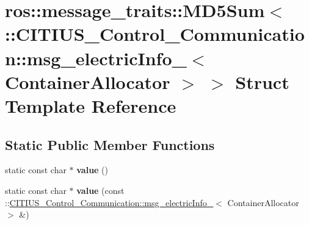 \hypertarget{structros_1_1message__traits_1_1_m_d5_sum_3_01_1_1_c_i_t_i_u_s___control___communication_1_1msg_20a1605dbd67ae3e89dfe57fef2b5cf4}{\section{ros\-:\-:message\-\_\-traits\-:\-:\-M\-D5\-Sum$<$ \-:\-:\-C\-I\-T\-I\-U\-S\-\_\-\-Control\-\_\-\-Communication\-:\-:msg\-\_\-electric\-Info\-\_\-$<$ \-Container\-Allocator $>$ $>$ \-Struct \-Template \-Reference}
\label{structros_1_1message__traits_1_1_m_d5_sum_3_01_1_1_c_i_t_i_u_s___control___communication_1_1msg_20a1605dbd67ae3e89dfe57fef2b5cf4}
}
\subsection*{\-Static \-Public \-Member \-Functions}
\begin{DoxyCompactItemize}
\item 
\hypertarget{structros_1_1message__traits_1_1_m_d5_sum_3_01_1_1_c_i_t_i_u_s___control___communication_1_1msg_20a1605dbd67ae3e89dfe57fef2b5cf4_a5d8e5cf35ef9bb1a78cfb9b1c0127ff1}{static const char $\ast$ {\bfseries value} ()}\label{structros_1_1message__traits_1_1_m_d5_sum_3_01_1_1_c_i_t_i_u_s___control___communication_1_1msg_20a1605dbd67ae3e89dfe57fef2b5cf4_a5d8e5cf35ef9bb1a78cfb9b1c0127ff1}

\item 
\hypertarget{structros_1_1message__traits_1_1_m_d5_sum_3_01_1_1_c_i_t_i_u_s___control___communication_1_1msg_20a1605dbd67ae3e89dfe57fef2b5cf4_a35de8e43dbccf8bc3ad87e723e5e25a4}{static const char $\ast$ {\bfseries value} (const \-::\hyperlink{struct_c_i_t_i_u_s___control___communication_1_1msg__electric_info__}{\-C\-I\-T\-I\-U\-S\-\_\-\-Control\-\_\-\-Communication\-::msg\-\_\-electric\-Info\-\_\-}$<$ \-Container\-Allocator $>$ \&)}\label{structros_1_1message__traits_1_1_m_d5_sum_3_01_1_1_c_i_t_i_u_s___control___communication_1_1msg_20a1605dbd67ae3e89dfe57fef2b5cf4_a35de8e43dbccf8bc3ad87e723e5e25a4}

\end{DoxyCompactItemize}
